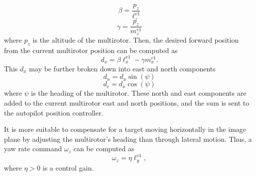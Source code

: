 \begin{equation}
\beta=\frac{p_z}{\ell^{v1}_z}
\end{equation} 
\begin{equation}
\gamma=\frac{p_z}{m^{v1}_z}
\end{equation} where $p_z$ is the altitude of the multirotor. Then, the desired forward position from the current multirotor position can be computed as 
\begin{equation}
d_x=\beta\ell^{v1}_x-\gamma{m}^{v1}_x.
\end{equation}
This $d_x$ may be further broken down into east and north components
\begin{equation}
d_n=d_x\sin(\psi)
\end{equation}
\begin{equation}
d_e=d_x\cos(\psi)
\end{equation} where $\psi$ is the heading of the multirotor. These north and east components are added to the current multirotor east and north positions, and the sum is sent to the autopilot position controller.

It is more suitable to compensate for a target moving horizontally in the image plane by adjusting the multirotor's heading than through lateral motion. Thus, a yaw rate command $\omega_z$ can be computed as 
\begin{equation}
\omega_z=\eta \ell^{v1}_y,
\end{equation} where $\eta>0$ is a control gain.
